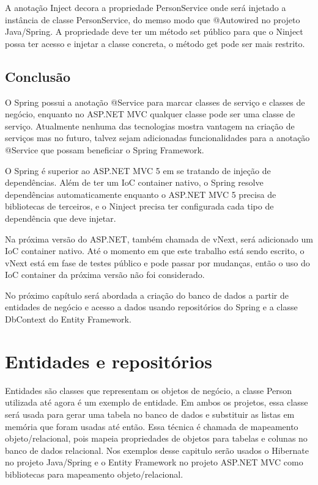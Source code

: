 \documentclass[a4paper,12pt]{article}
\begin{document}
A anotação Inject decora a propriedade PersonService onde será injetado a instância de classe PersonService, do memso modo que @Autowired no projeto Java/Spring. A propriedade deve ter um método set público para que o Ninject possa ter acesso e injetar a classe concreta, o método get pode ser mais restrito.

\subsection{Conclusão}

O Spring possui a anotação @Service para marcar classes de serviço e classes de negócio, enquanto no ASP.NET MVC qualquer classe pode ser uma classe de serviço. Atualmente nenhuma das tecnologias mostra vantagem na criação de serviços mas no futuro, talvez sejam adicionadas funcionalidades para a anotação @Service que possam beneficiar o Spring Framework.

O Spring é superior ao ASP.NET MVC 5 em se tratando de injeção de dependências. Além de ter um IoC container nativo, o Spring resolve dependências automaticamente enquanto o ASP.NET MVC 5 precisa de bibliotecas de terceiros, e o Ninject precisa ter configurada cada tipo de dependência que deve injetar.

Na próxima versão do ASP.NET, também chamada de vNext, será adicionado um IoC container nativo. Até o momento em que este trabalho está sendo escrito, o vNext está em fase de testes público e pode passar por mudanças, então o uso do IoC container da próxima versão não foi considerado.

No próximo capítulo será abordada a criação do banco de dados a partir de entidades de negócio e acesso a dados usando repositórios do Spring e a classe DbContext do Entity Framework.

\newpage
\section{Entidades e repositórios}

Entidades são classes que representam os objetos de negócio, a classe Person utilizada até agora é um exemplo de entidade. Em ambos os projetos, essa classe será usada para gerar uma tabela no banco de dados e substituir as listas em memória que foram usadas até então. Essa técnica é chamada de mapeamento objeto/relacional, pois mapeia propriedades de objetos para tabelas e colunas no banco de dados relacional. Nos exemplos desse capitulo serão usados o Hibernate no projeto Java/Spring e o Entity Framework no projeto ASP.NET MVC como bibliotecas para mapeamento objeto/relacional.
\end{document}
